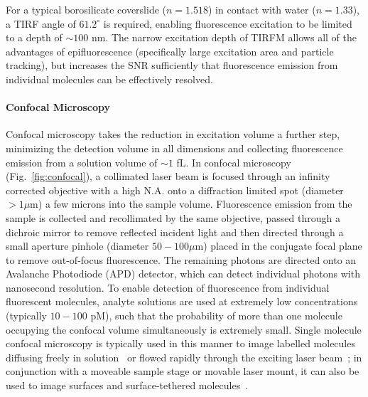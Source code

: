 For a typical borosilicate coverslide ($n = 1.518$) in contact with water ($n = 1.33$), a TIRF angle of $61.2^{\circ}$ is required, enabling fluorescence excitation to be limited to a depth of $\sim 100$ nm. The narrow excitation depth of TIRFM allows all of the advantages of epifluorescence (specifically large excitation area and particle tracking), but increases the SNR sufficiently that fluorescence emission from individual molecules can be effectively resolved.

\paragraph{Confocal Microscopy}
Confocal microscopy takes the reduction in excitation volume a further step, minimizing the detection volume in all dimensions and collecting fluorescence emission from a solution volume of $\sim 1$ fL. In confocal microscopy (Fig.~\ref{fig:confocal}), a collimated laser beam is focused through an infinity corrected objective with a high N.A. onto a diffraction limited spot (diameter $> 1 \mu$m) a few microns into the sample volume. Fluorescence emission from the sample is collected and recollimated by the same objective, passed through a dichroic mirror to remove reflected incident light and then directed through a small aperture pinhole (diameter $50 - 100 \mu$m) placed in the conjugate focal plane to remove out-of-focus fluorescence. The remaining photons are directed onto an Avalanche Photodiode (APD) detector, which can detect individual photons with nanosecond resolution. To enable detection of fluorescence from individual fluorescent molecules, analyte solutions are used at extremely low concentrations (typically $10 - 100$ pM), such that the probability of more than one molecule occupying the confocal volume simultaneously is extremely small. Single molecule confocal microscopy is typically used in this manner to image labelled molecules diffusing freely in solution~\cite{weiss00} or flowed rapidly through the exciting laser beam~\cite{horrocks2012}; in conjunction with a moveable sample stage or movable laser mount, it can also be used to image surfaces and surface-tethered molecules~\cite{Brown2008}. 


